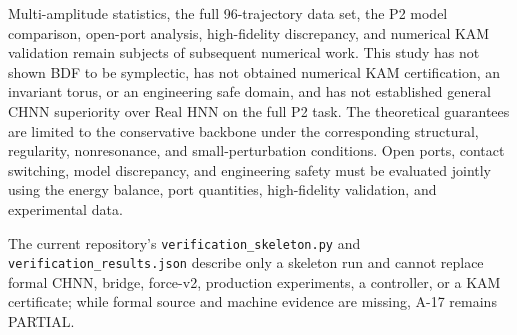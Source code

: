 Multi-amplitude statistics, the full 96-trajectory data set, the P2 model comparison, open-port analysis, high-fidelity discrepancy, and numerical KAM validation remain subjects of subsequent numerical work. This study has not shown BDF to be symplectic, has not obtained numerical KAM certification, an invariant torus, or an engineering safe domain, and has not established general CHNN superiority over Real HNN on the full P2 task. The theoretical guarantees are limited to the conservative backbone under the corresponding structural, regularity, nonresonance, and small-perturbation conditions. Open ports, contact switching, model discrepancy, and engineering safety must be evaluated jointly using the energy balance, port quantities, high-fidelity validation, and experimental data.

The current repository's \texttt{verification\_skeleton.py} and \texttt{verification\_results.json} describe only a skeleton run and cannot replace formal CHNN, bridge, force-v2, production experiments, a controller, or a KAM certificate; while formal source and machine evidence are missing, A-17 remains PARTIAL.
